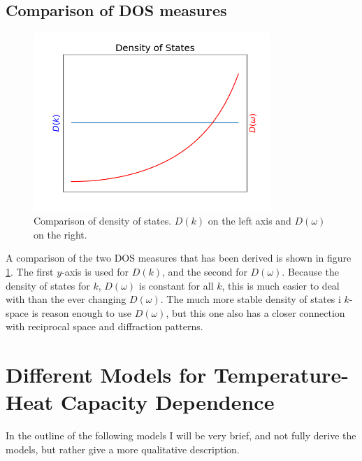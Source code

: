\documentclass[11pt]{amsart}
\begin{document}
\subsection{Comparison of DOS measures}
\begin{figure}
\centering
	\includegraphics[width = 0.8\textwidth]{DOS.png}
	\caption{Comparison of density of states. $D(k)$ on the left axis and $D(\omega)$ on the right.}
	\label{fig:DOS}
\end{figure}

A comparison of the two DOS measures that has been derived is shown in figure \ref{fig:DOS}. The first $y$-axis is used for $D(k)$, and the second for $D(\omega)$. Because the density of states for $k$, $D(\omega)$ is constant for all $k$, this is much easier to deal with than the ever changing $D(\omega)$. The much more stable density of states i $k$-space is reason enough to use $D(\omega)$, but this one also has a closer connection with reciprocal space and diffraction patterns.

\section{Different Models for Temperature-Heat Capacity Dependence}
In the outline of the following models I will be very brief, and not fully derive the models, but rather give a more qualitative description.
\end{document}
